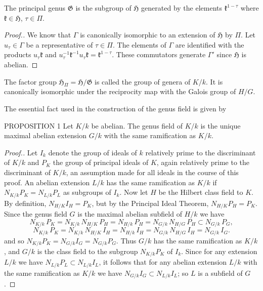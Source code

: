 \begin{lemma}\label{lem:VII-2}
The principal genus $\mathfrak{G}$ is the subgroup of $\mathfrak{H}$
generated by the elements $\mathfrak{k}^{1-\tau}$ where
$\mathfrak{k}\in\mathfrak{H}$, $\tau\in\Pi$.
\end{lemma}

\begin{proof}[Proof.]
We know that $\Gamma$ is canonically isomorphic to an extension of
$\mathfrak{H}$ by $\Pi$. Let $u_{\tau}\in\Gamma$ be a representative of
$\tau\in\Pi$. The elements of $\Gamma$ are identified with the products
$u_{\tau}\mathfrak{k}$ and
$u_{\tau}^{-1}\mathfrak{k}^{-1}u_{\tau}\mathfrak{k}
=\mathfrak{k}^{1-\tau}$. These commutators generate $\Gamma'$ since
$\mathfrak{H}$ is abelian.
\end{proof}

The factor group $\mathfrak{H}_{\Pi}=\mathfrak{H}/\mathfrak{G}$ is called
the group of genera of $K/k$. It is canonically isomorphic under the
reciprocity map with the Galois group of $H/G$.

The essential fact used in the construction of the genus field is given by

\begin{namedstmt}{PROPOSITION 1}
Let $K/k$ be abelian. The genus field of $K/k$ is the unique maximal
abelian extension $G/k$ with the same ramification as $K/k$.
\end{namedstmt}

\begin{proof}[Proof.]
Let $I_{k}$ denote the group of ideals of $k$ relatively prime to the
discriminant of $K/k$ and $P_{K}$ the group of principal ideals of $K$,
again relatively prime to the discriminant of $K/k$, an assumption made
for all ideals in the course of this proof. An abelian extension $L/k$
has the same ramification as $K/k$ if
$N_{K/k}P_{K}=N_{L/k}P_{L}$ as subgroups of $I_{k}$. Now let $H$ be the
Hilbert class field to $K$. By definition, $N_{H/K}I_{H}=P_{K}$, but by
the Principal Ideal Theorem, $N_{H/K}P_{H}=P_{K}$. Since the genus field
$G$ is the maximal abelian subfield of $H/k$ we have
\[
N_{K/k}\,P_{K}=N_{K/k}\,N_{H/K}\,P_{H}=N_{H/k}\,P_{H}
=N_{G/k}\,N_{H/G}\,P_{H}\subset N_{G/k}\,P_{G},
\]
\[
N_{K/k}\,P_{K}=N_{K/k}\,N_{H/K}\,I_{H}=N_{H/k}\,I_{H}
=N_{G/k}\,N_{H/G}\,I_{H}=N_{G/k}\,I_{G}.
\]
and so $N_{K/k}P_{K}=N_{G/k}I_{G}=N_{G/k}P_{G}$. Thus $G/k$ has the same
ramification as $K/k$, and $G/k$ is the class field to the subgroup
$N_{K/k}P_{K}$ of $I_{k}$. Since for any extension $L/k$ we have
$N_{L/k}P_{L}\subset N_{L/k}I_{L}$, it follows that for any abelian
extension $L/k$ with the same ramification as $K/k$ we have
$N_{G/k}I_{G}\subset N_{L/k}I_{L}$; so $L$ is a subfield of $G$.
\end{proof}


